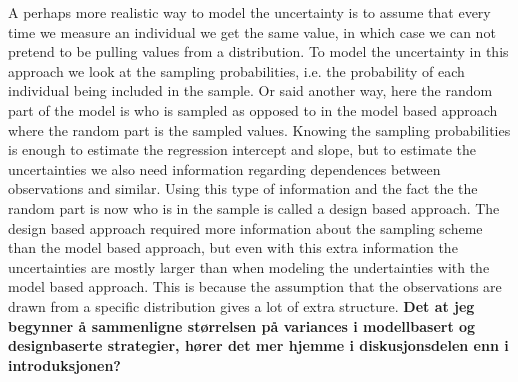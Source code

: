 \documentclass{article}
\begin{document}
A perhaps more realistic way to model the uncertainty is to assume that every time we measure an
individual we get the same value, in which case we can not pretend to be pulling
values from a distribution. To model the uncertainty in this approach we look at
the sampling probabilities, i.e. the probability of each individual being
included in the sample. Or said another way, here the random part of the model
is who is sampled as opposed to in the model based approach where the random
part is the sampled values. Knowing the sampling probabilities is enough to
estimate the regression intercept and slope, but to estimate the uncertainties
we also need information regarding dependences between observations and similar.
Using this type of information and the fact the the random part is now who is in
the sample is called a design based approach. The design based approach required
more information about the sampling scheme than the model based approach, but
even with this extra information the uncertainties are mostly larger than when
modeling the undertainties with the model based approach. This is because the
assumption that the observations are drawn from a specific distribution gives a
lot of extra structure.
\textbf{Det at jeg begynner å sammenligne størrelsen på variances i modellbasert
og designbaserte strategier, hører det mer hjemme i diskusjonsdelen enn i introduksjonen?}




\end{document}

